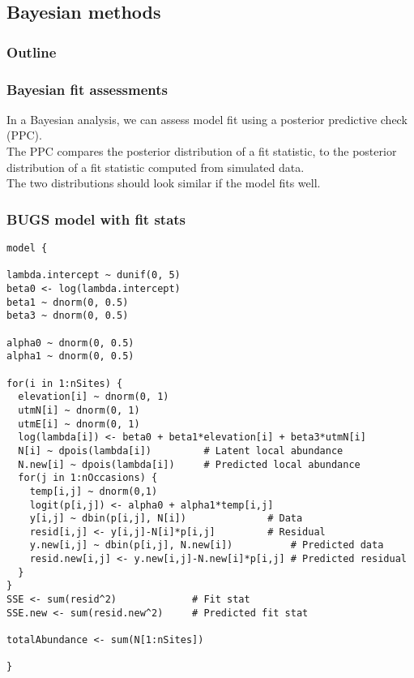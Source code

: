 \documentclass[color=usenames,dvipsnames]{beamer}\usepackage[]{graphicx}\usepackage[]{xcolor}
\makeatletter
\newenvironment{kframe}{%
 \def\at@end@of@kframe{}%
 \ifinner\ifhmode%
  \def\at@end@of@kframe{\end{minipage}}%
  \begin{minipage}{\columnwidth}%
 \fi\fi%
 \def\FrameCommand##1{\hskip\@totalleftmargin \hskip-\fboxsep
 \colorbox{shadecolor}{##1}\hskip-\fboxsep
     \hskip-\linewidth \hskip-\@totalleftmargin \hskip\columnwidth}%
 \MakeFramed {\advance\hsize-\width
   \@totalleftmargin\z@ \linewidth\hsize
   \@setminipage}}%
 {\par\unskip\endMakeFramed%
 \at@end@of@kframe}
\newenvironment{knitrout}{}{} %
\makeatother
\begin{document}
\subsection{Bayesian methods}



\begin{frame}[plain]
  \frametitle{Outline}
  \Large
\end{frame}




\begin{frame}[fragile]
  \frametitle{Bayesian fit assessments}
  In a Bayesian analysis, we can assess model fit using a
  \alert{posterior predictive check} (PPC). \\
  \pause
  \vfill
  The PPC compares the posterior distribution of a fit statistic, to
  the posterior distribution of a fit statistic computed from
  simulated data. \\ 
  \pause
  \vfill
  The two distributions should look similar if the model fits well. \\
\end{frame}




\begin{frame}[fragile]
  \frametitle{BUGS model with fit stats}
\begin{knitrout}\tiny
{}\color{fgcolor}\begin{kframe}
\begin{verbatim}
model {

lambda.intercept ~ dunif(0, 5)
beta0 <- log(lambda.intercept)
beta1 ~ dnorm(0, 0.5)
beta3 ~ dnorm(0, 0.5)

alpha0 ~ dnorm(0, 0.5)  
alpha1 ~ dnorm(0, 0.5)

for(i in 1:nSites) {
  elevation[i] ~ dnorm(0, 1)
  utmN[i] ~ dnorm(0, 1)
  utmE[i] ~ dnorm(0, 1)
  log(lambda[i]) <- beta0 + beta1*elevation[i] + beta3*utmN[i]
  N[i] ~ dpois(lambda[i])         # Latent local abundance
  N.new[i] ~ dpois(lambda[i])     # Predicted local abundance
  for(j in 1:nOccasions) {
    temp[i,j] ~ dnorm(0,1)
    logit(p[i,j]) <- alpha0 + alpha1*temp[i,j]
    y[i,j] ~ dbin(p[i,j], N[i])              # Data
    resid[i,j] <- y[i,j]-N[i]*p[i,j]         # Residual
    y.new[i,j] ~ dbin(p[i,j], N.new[i])          # Predicted data
    resid.new[i,j] <- y.new[i,j]-N.new[i]*p[i,j] # Predicted residual
  }
}
SSE <- sum(resid^2)             # Fit stat
SSE.new <- sum(resid.new^2)     # Predicted fit stat

totalAbundance <- sum(N[1:nSites])

}
\end{verbatim}
\end{kframe}
\end{knitrout}
\end{frame}
\end{document}
